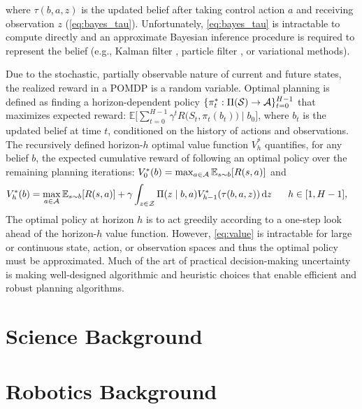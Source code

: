 where $\tau(b,a,z)$ is the updated belief after taking control action $a$ and receiving observation $z$ (\cref{eq:bayes_tau}). Unfortunately, \cref{eq:bayes_tau} is intractable to compute directly and an approximate Bayesian inference procedure is required to represent the belief (e.g., Kalman filter \cite{welch1995introduction}, particle filter \cite{Silver2010}, or variational methods). 

Due to the stochastic, partially observable nature of current and future states, the realized reward in a POMDP is a random variable. Optimal planning is defined as finding a horizon-dependent policy $\{\pi_t^*: \Pi(\mathcal{S}) \to \mathcal{A}\}_{t=0}^{H-1}$ that maximizes expected reward: $\mathbb{E} \Big[ \sum_{t=0}^{H-1} \gamma^t R\big(S_t, \pi_t(b_t)\big) \mid b_0 \Big]$, where $b_t$ is the updated belief at time $t$, conditioned on the history of actions and observations. The recursively defined horizon-$h$ optimal value function $V^*_h$ quantifies, for any belief $b$, the expected cumulative reward of following an optimal policy over the remaining planning iterations: $V_0^{*}(b) = \operatorname*{max}_{a \in \mathcal{A}} \mathbb{E}_{s \sim b}[R(s, a)]$ and
\begin{align}
     V_h^{*}(b) &=  \max_{a \in \mathcal{A}} \mathbb{E}_{s \sim b}[R(s, a)] + \gamma \int_{z \in \mathcal{Z}} \Pi(z \mid b, a) V_{h-1}^*(\tau(b, a,z)) \, \text{d}z \hspace{0.6cm} h \in [1, H-1],
    \label{eq:value}
\end{align}
The optimal policy at horizon $h$ is to act greedily according to a one-step look ahead of the horizon-$h$ value function. However, \cref{eq:value} is intractable for large or continuous state, action, or observation spaces and thus the optimal policy must be approximated. Much of the art of practical decision-making uncertainty is making well-designed algorithmic and heuristic choices that enable efficient and robust planning algorithms.

\section{Science Background} 

\section{Robotics Background}
